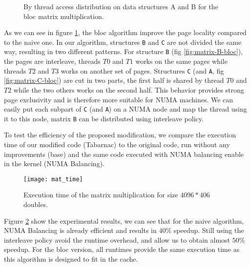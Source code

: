\begin{figure}[htb]
    \centering
    \caption{By thread access distribution on data structures A and B for the
    bloc matrix multiplication.}
    \label{fig:matrix-bloc}
\end{figure}

As we can see in figure \ref{fig:matrix-bloc}, the bloc algorithm improve the page
locality compared to the naive one. In our algorithm, structures \texttt{B}
and \texttt{C} are not divided the same way, resulting in two different
patterns. For structure \texttt{B} (fig \ref{fig:matrix-B-bloc}), the pages
are interleave, threads $T0$ and $T1$ works on the same pages while threads
$T2$ and $T3$ works on another set of pages. Structures \texttt{C} (and
\texttt{A}, fig \ref{fig:matrix-C-bloc}) are cut in two parts, the first half
is shared by thread $T0$ and $T2$ while the two others works on the second
half. This behavior provides strong page exclusivity and is therefore more
suitable for NUMA machines. We can easily put each subpart of \texttt{C} (and
\texttt{A}) on a NUMA node and map the thread using it to this node, matrix
\texttt{B} can be distributed using interleave policy.

To test the efficiency of the proposed modification, we compare the execution
time of our modified code (Tabarnac) to the  original code, run without any
improvements (base) and the same code executed with NUMA balancing enable in the
kernel (NUMA Balancing).

\begin{figure}[htb]
    \centering
    \texttt{[image: mat\_time]}
    \caption{Execution time of the matrix multiplication for size $4096*406$ doubles.}
    \label{fig:matrix-res}
\end{figure}

Figure \ref{fig:matrix-res} show the experimental results, we can see that for
the naive algorithm, NUMA Balancing is already efficient and results in $40\%$
speedup. Still using the interleave policy avoid the runtime overhead, and
allow us to obtain almost $50\%$ speedup. For the bloc version, all runtimes
provide the same execution time as this algorithm is designed to fit in the
cache.

